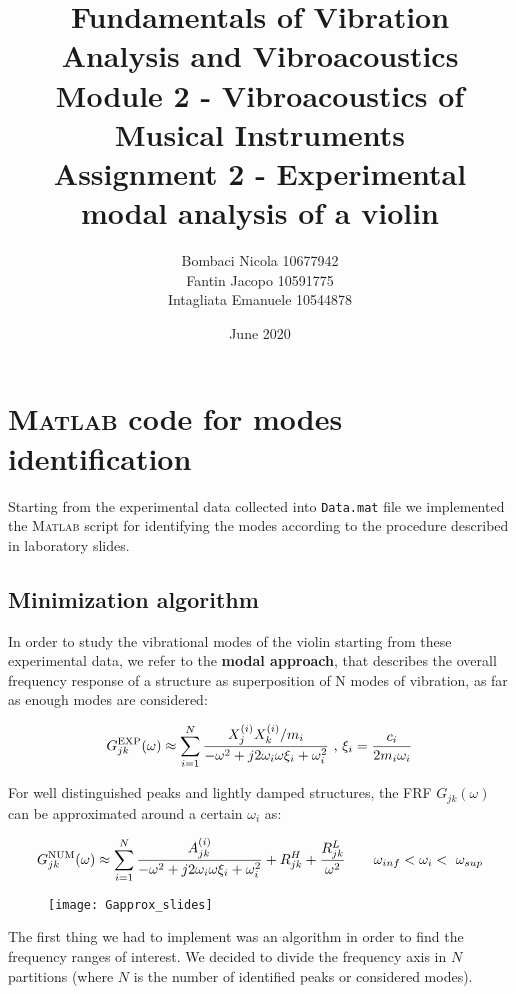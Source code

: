 \documentclass[a4paper,12pt,oneside]{article}
\title{Fundamentals of Vibration Analysis and Vibroacoustics \\
	Module 2 - Vibroacoustics of Musical Instruments \\
	Assignment 2 - Experimental modal analysis of a violin}
\author{Bombaci Nicola 10677942 \\
	Fantin Jacopo 10591775 \\
	Intagliata Emanuele 10544878}
\date{June 2020}
\begin{document}
\maketitle

\vspace{100pt}


\section{\textsc{Matlab} code for modes identification}
Starting from the experimental data collected into \texttt{Data.mat} file we implemented the \textsc{Matlab} script for identifying the modes according to the
procedure described in laboratory slides.

\subsection{Minimization algorithm}
In order to study the vibrational modes of the violin starting from these experimental data, we refer to the \textbf{modal approach}, that describes the overall frequency response of a structure as superposition of N modes of vibration, as far as enough modes are considered:

\begin{equation}
\label{eqn:h_exp_modal} 
	G^\textup{EXP}_{jk}(\omega) \approx \sum_{i=1}^{N} \frac{X_j^{(i)} X_k^{(i)} / m_i}
		{-\omega^2 + j 2 \omega_i \omega \xi_i + \omega^2_i}
		~ \text{,} ~ 
		\xi_i = \frac{c_i}{2 m_i \omega_i}
\end{equation}

For well distinguished peaks and lightly damped structures, the FRF $G_{jk} (\omega)$ can be approximated around a certain $\omega_i$ as:

\begin{equation}
\label{eqn:h_approx} 
	G^\textup{NUM}_{jk}(\omega) \approx \sum_{i=1}^{N} \frac{ A_{jk}^{(i)} }
		{-\omega^2 + j 2 \omega_i \omega \xi_i + \omega^2_i}
		+ R^H_{jk} + \frac{R^L_{jk}}{\omega^2}
		\qquad
		\omega_{inf} < \omega_i < \ \omega_{sup}
\end{equation}

\begin{figure}[H]
	\centering
	\texttt{[image: Gapprox\_slides]}
\end{figure}

The first thing we had to implement was an algorithm in order to find the frequency ranges of interest. We decided to divide the frequency axis in $N$ partitions (where $N$ is the number of identified peaks or considered modes).
\end{document}
